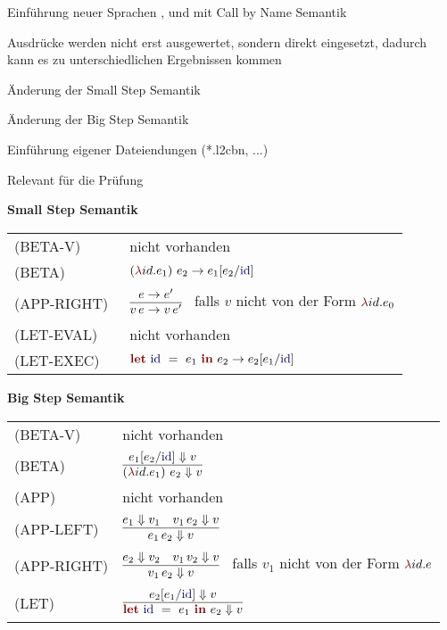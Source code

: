 {
  \begin{itemgroup}{}
    \item Einführung neuer Sprachen \LZEROCBN, \LONECBN und \LTWOCBN  mit Call by Name Semantik
    \item Ausdrücke werden nicht erst ausgewertet, sondern direkt eingesetzt,
          dadurch kann es zu unterschiedlichen Ergebnissen kommen
    \item Änderung der Small Step Semantik
    \item Änderung der Big Step Semantik
    \item Einführung eigener Dateiendungen (*.l2cbn, ...)
    \item Relevant für die Prüfung \glqq \TPONE \grqq
  \end{itemgroup}
}


{
  {\bf Small Step Semantik}\\[5mm]
  \begin{tabular}{ll}
     \mbox{(BETA-V)}      & nicht vorhanden \\[3mm]
     \mbox{(BETA)}        & $\ExprApplication{\Parenthesis{\ExprLambda{id}{}{e_1}}}{e_2} \to
                                               e_1[e_2/\ExprIdentifier{id}]$ \\[3mm]
     \mbox{(APP-RIGHT)\ } & $\smallsteprule{e \to e'}
                              {v\,e \to v\,e'}$ \ 
                              falls ${v}$ nicht von der Form $\ExprLambda{id}{}{e_0}$ \\[5mm]
     \mbox{(LET-EVAL)\  } & nicht vorhanden \\[3mm]
     \mbox{(LET-EXEC)}    & $\ExprLet{\ExprIdentifier{id}}{}{e_1}{e_2} \to
                                      e_2[e_1/\ExprIdentifier{id}]$ \\[3mm]
  \end{tabular}
}


{
  {\bf Big Step Semantik}\\[5mm]
  \begin{tabular}{ll}
     \mbox{(BETA-V)}      & nicht vorhanden \\[3mm]
     \mbox{(BETA)}        & $\bigsteprule{e_1[e_2/\ExprIdentifier{id}] \eval v}
                              {\ExprApplication{\Parenthesis{\ExprLambda{id}{}{e_1}}}{e_2} \eval v}$ \\[5mm]
     \mbox{(APP)}         & nicht vorhanden \\[3mm]
     \mbox{(APP-LEFT)}    & $\bigsteprule{e_1 \eval v_1 \quad v_1\,e_2 \eval v}
                              {e_1\,e_2 \eval v}$ \\[5mm]
     \mbox{(APP-RIGHT)}   & $\bigsteprule{e_2 \eval v_2 \quad v_1\,v_2 \eval v}
                              {v_1\,e_2 \eval v}$ \ 
                              falls ${v_1}$ nicht von der Form $\ExprLambda{id}{}{e}$ \\[5mm]
     \mbox{(LET)}         & $\bigsteprule{e_2[e_1/\ExprIdentifier{id}] \eval v}
                              {\ExprLet{\ExprIdentifier{id}}{}{e_1}{e_2} \eval v}$ \\[5mm]
  \end{tabular}
}



